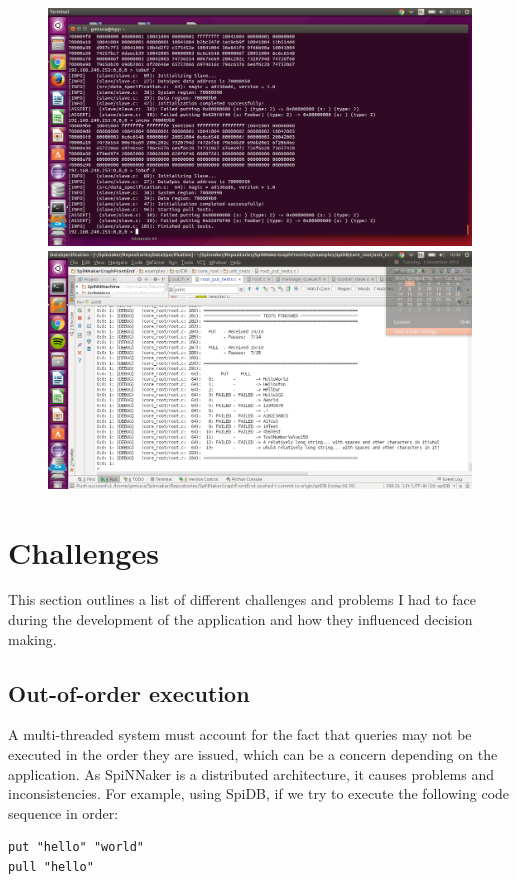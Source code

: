 \begin{figure}
  \centering
  \includegraphics[width=1.15\linewidth, natwidth=1366, natheight=768]{images/debugging.png}
  \label{fig:debugging}
  \centering
  \includegraphics[width=1.15\linewidth, natwidth=1366, natheight=768]{images/testing.png}
  \label{fig:testing}
\end{figure}

\section{Challenges}
This section outlines a list of different challenges and problems I had to face during the development of the application and how they influenced decision making.

\subsection{Out-of-order execution}
\label{sec:out-of-order}
A multi-threaded system must account for the fact that queries may not be executed in the order they are issued, which can be a concern depending on the application. As SpiNNaker is a distributed architecture, it causes problems and inconsistencies.
For example, using SpiDB, if we try to execute the following code sequence in order:\\
\begin{lstlisting}[caption={Non-blocking execution}, label=list:non-blocking]
put "hello" "world"
pull "hello"
\end{lstlisting}

